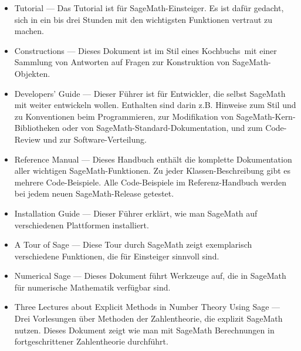 \begin{itemize}
\item Tutorial --- Das Tutorial ist für SageMath-Einsteiger.
  Es ist dafür gedacht, sich in ein bis drei Stunden mit den
  wichtigsten Funktionen vertraut zu machen.

\item Constructions --- Dieses Dokument ist im Stil eines \glqq Kochbuchs\grqq~mit
  einer Sammlung von Antworten auf Fragen zur Konstruktion von SageMath-Objekten.

\item Developers' Guide --- Dieser Führer ist für Entwickler, die selbst SageMath
  mit weiter entwickeln wollen. Enthalten sind darin z.B. Hinweise zum
  Stil und zu Konventionen beim Programmieren, zur Modifikation von
  SageMath-Kern-Bibliotheken oder von SageMath-Standard-Dokumentation, und zum Code-Review
  und zur Software-Verteilung.

\item Reference Manual --- Dieses Handbuch enthält die komplette Dokumentation
  aller wichtigen SageMath-Funktionen. Zu jeder Klassen-Beschreibung gibt es
  mehrere Code-Beispiele. Alle Code-Beispiele im Referenz-Handbuch werden
  bei jedem neuen SageMath-Release getestet.

\item Installation Guide --- Dieser Führer erklärt, wie man SageMath auf
  verschiedenen Plattformen installiert.

\item A Tour of Sage --- Diese Tour durch SageMath zeigt exemplarisch verschiedene
  Funktionen, die für Einsteiger sinnvoll sind.

\item Numerical Sage --- Dieses Dokument führt Werkzeuge auf, die in SageMath
  für numerische Mathematik verfügbar sind.

\item Three Lectures about Explicit Methods in Number Theory Using
  Sage --- Drei Vorlesungen über Methoden der Zahlentheorie, die explizit
  SageMath nutzen. Dieses Dokument zeigt wie man mit SageMath Berechnungen in
  fortgeschrittener Zahlentheorie durchführt.
\end{itemize}

